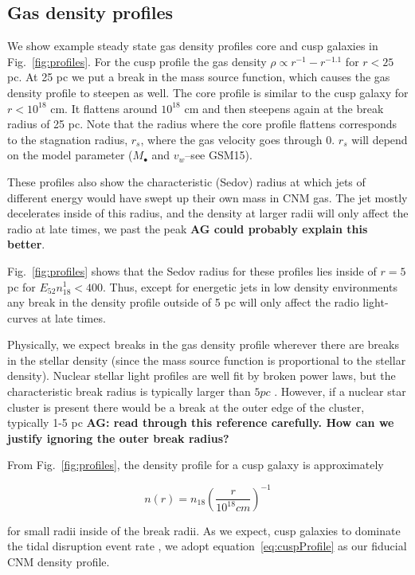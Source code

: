 \documentclass[usenatbib,fleqn]{mnras}
\newcommand{\Mbh}[1][]{M_{\bullet#1}}
\begin{document}
\subsection{Gas density profiles}
We show example steady state gas density profiles core and cusp
galaxies in Fig.~\ref{fig:profiles}. For the cusp profile the gas density
$\rho \propto r^{-1}-r^{-1.1}$ for $r < 25$ pc. At 25 pc we put a
break in the mass source function, which causes the gas density
profile to steepen as well. The core profile is similar to the cusp
galaxy for $r<10^{18}$ cm. It flattens around $10^{18}$ cm and then
steepens again at the break radius of 25 pc. Note that the radius
where the core profile flattens corresponds to the stagnation
radius,  $r_s$,  where the gas velocity goes through 0.  $r_s$ will
depend on the model parameter ($\Mbh$ and $v_w$--see GSM15).

These profiles also show the characteristic (Sedov) radius at which
jets of different energy would have swept up their own mass in CNM
gas.  The jet mostly decelerates inside of this radius, and the
density at larger radii will only affect the radio at late times, we
past the peak {\bf AG could probably explain this better}.

Fig.~\ref{fig:profiles} shows that the Sedov radius for these profiles
lies inside of $r=5$ pc for $E_{52} n_{18}^{1} < 400$.  Thus, except
for energetic jets in low density environments any break in the
density profile outside of 5 pc will only affect the radio light-curves at
late times.

Physically, we expect breaks in the gas density profile wherever there
are breaks in the stellar density (since the mass source function is
proportional to the stellar density).  Nuclear stellar light profiles
are well fit by broken power laws, but the characteristic break radius
is typically larger than $5 pc$ \citep{Lauer+2007}. However, if a
nuclear star cluster is present there would be a break at the outer
edge of the cluster, typically 1-5 pc \citep{Georgiev+2014} {\bf AG:
  read through this reference carefully. How can we justify ignoring
  the outer break radius?} 

From Fig.~\ref{fig:profiles}, the density profile for a
cusp galaxy is approximately 

\begin{equation}
n(r) = n_{18} \left(\frac{r}{10^{18} cm}\right)^{-1}
\label{eq:cuspProfile}
\end{equation}

for small radii inside of the break radii. As we expect, cusp galaxies
to dominate the tidal disruption event rate \citep{Stone+2014}, we adopt
equation~\eqref{eq:cuspProfile} as our fiducial CNM density profile.
\end{document}
